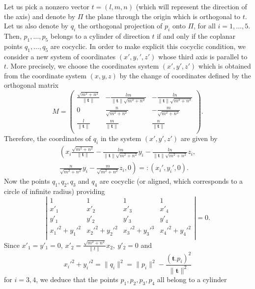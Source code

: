\documentclass[5p]{elsarticle}
\def\tg{{\mathbf{t}}}
\newcommand{\com}[1]{{\color{black} #1}}
\newcommand{\lb}[1]{{\color{black} #1}}
\begin{document}
Let us pick a nonzero vector $t=(l,m,n)$ (which will represent the direction of the axis) and denote by $\Pi$ the plane through the origin which is orthogonal to $t$. Let us also denote by $q_i$ the orthogonal projection of $p_i$ onto $\Pi$, for all $i=1,\ldots,5$. Then, $p_1,\ldots,p_5$ belongs to a cylinder of direction $t$ if and only if the coplanar points $q_1,\ldots,q_5$ are cocyclic. In order to make explicit \lb{this cocyclic condition}, we consider a new system of coordinates $(x',y,',z')$ whose third axis is parallel to $t$. More precisely, we choose the coordinates system $(x',y',z')$ which is obtained from the coordinate system $(x,y,z)$ by the change of coordinates defined by the orthogonal matrix
$$M=\left( \begin{array}{ccc}
           \frac{\sqrt{m^{2}+n^{2}}}{\|\tg\|} & -\frac{lm}{\|\tg\|\sqrt{m^{2}+n^{2}}} & -\frac{ln}{\|\tg\|\sqrt{m^{2}+n^{2}}} \\
           0 & \frac{n}{\sqrt{m^{2}+n^{2}}} & -\frac{m}{\sqrt{m^{2}+n^{2}}} \\
           \frac{l}{\|\tg\|} & \frac{m}{\|\tg\|} & \frac{n}{\|\tg\|} \\
           \end{array} \right).$$
Therefore, the coordinates of $q_i$ in the system $(x',y',z')$ are given by
\begin{multline*}
\left( x_{i} \frac{\sqrt{m^{2}+n^{2}}}{\|\tg\|}  - \frac{lm}{\|\tg\|\sqrt{m^{2}+n^{2}}} y_i -\frac{ln}{\|\tg\|\sqrt{m^{2}+n^{2}}} z_i , \right. \\
 \left.        \frac{n}{\sqrt{m^{2}+n^{2}}} y_i  -\frac{m}{\sqrt{m^{2}+n^{2}}} z_i , 0 \right)=:(x_i',y_i',0).
\end{multline*}
\com{Now} the points $q_1,q_2,q_3$ and $q_4$ are cocyclic (or aligned, which corresponds to a circle of infinite radius) providing 
$$\left|
           \begin{array}{cccc}
           1 & 1 & 1 & 1 \\
           x'_1 & x'_2 & x'_3 & x'_4 \\
           y'_1 & y'_2 & y'_3 & y'_4 \\
           x_1'^2+y_1'^2 & x_2'^2+y_2'^2 & x_3'^2+y_3'^3 & x_4'^2+y_4'^2 \\
           \end{array}
  \right|=0.$$
Since $x'_1=y'_1=0$, $x'_2=\frac{\sqrt{m^{2}+n^{2}}}{\|t\|} x_2, \ y'_2=0$ and
$$x_i'^2+y_i'^2=\|q_i\|^2=\|p_i\|^2-\frac{(\tg.p_i)^2}{\|\tg\|^{2}}$$
for $i=3,4$, we deduce that the points $p_1,p_2,p_3,p_4$ all belong to a cylinder  
\end{document}

